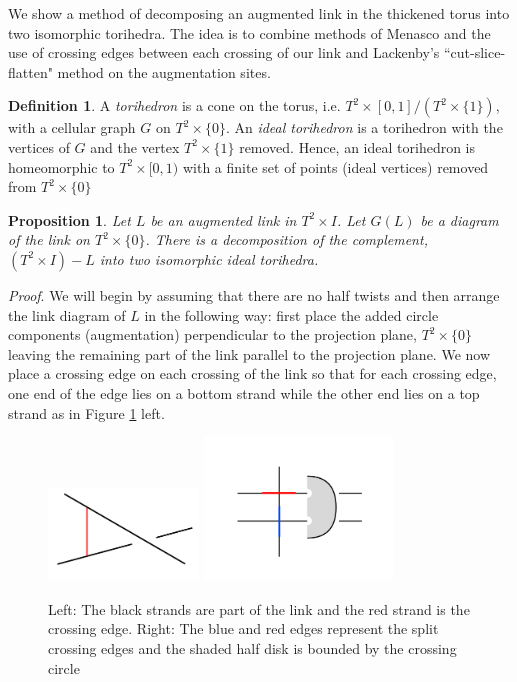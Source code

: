 \documentclass[11pt]{amsart}
\theoremstyle{plain}
\newtheorem{prop}[theorem]{Proposition}
\theoremstyle{definition}
\newtheorem{define}[theorem]{Definition}
\begin{document}
We show a method of decomposing an augmented link in the thickened torus into two isomorphic torihedra. The idea is to combine methods of Menasco \cite{Menasco} and the use of crossing edges between each crossing of our link and Lackenby's ``cut-slice-flatten" method \cite{lackenby} on the augmentation sites.   


\begin{define}\cite{CKP2} \label{def:torihedron}
 A \emph{torihedron} is a cone on the torus, i.e. $T^2 \times [0,1]/(T^2 \times \{1\})$, with a cellular graph $G$ on $T^2 \times \{0\}$. An \emph{ideal torihedron} is a torihedron with the vertices of $G$ and the vertex $T^2 \times \{1\}$ removed. Hence, an ideal torihedron is homeomorphic to $T^2 \times [0,1)$ with a finite set of points (ideal vertices) removed from $T^2 \times \{0\}$ 
\end{define}

\begin{prop}\label{thm:torihedraldecomposition}
Let $L$ be an augmented link in $T^2 \times I$. Let $G(L)$ be a diagram of the link on $T^2 \times \{0\}$. There is a decomposition of the complement, $(T^2 \times I) - L$ into two isomorphic ideal torihedra.
\end{prop}

\textit{Proof}. We will begin by assuming that there are no half twists and then arrange the link diagram of $L$ in the following way: first place the added circle components (augmentation) perpendicular to the projection plane, $T^2 \times \{0\}$ leaving the remaining part of the link parallel to the projection plane. 
We now place a crossing edge on each crossing of the link so that for each crossing edge, one end of the edge lies on a bottom strand while the other end lies on a top strand as in Figure \ref{fig:crossingArc} left.

\begin{figure}
 \centering
 \includegraphics[width=4cm]{crossingArc}
  \includegraphics[width=5cm]{crossingPush}
 \caption{Left: The black strands are part of the link and the red strand is the crossing edge. Right: The blue and red edges represent the split crossing edges and the shaded half disk is bounded by the crossing circle}
 \label{fig:crossingArc}
 \end{figure}
\end{document}
